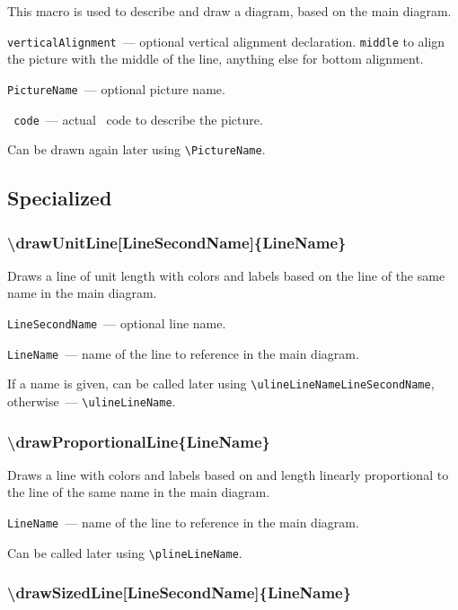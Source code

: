 	This macro is used to describe and draw a diagram, based on the main diagram.

	\texttt{verticalAlignment}~— optional vertical alignment declaration. \texttt{middle} to align the picture with the middle of the line, anything else for bottom alignment.

	\texttt{PictureName}~— optional picture name.

	\texttt{\METAPOST\ code}~— actual \METAPOST\ code to describe the picture.
	
	Can be drawn again later using \texttt{\textbackslash PictureName}.


\subsection{Specialized}

\subsubsection{\textbackslash drawUnitLine[LineSecondName]\{LineName\}}

	Draws a line of unit length with colors and labels based on the line of the same name in the main diagram.

	\texttt{LineSecondName}~— optional line name.
	
	\texttt{LineName}~— name of the line to reference in the main diagram. 

	If a name is given, can be called later using \texttt{\textbackslash ulineLineNameLineSecondName}, otherwise~— \texttt{\textbackslash ulineLineName}. 

\subsubsection{\textbackslash drawProportionalLine\{LineName\}}

	Draws a line with colors and labels based on and length linearly proportional to the line of the same name in the main diagram.

	\texttt{LineName}~— name of the line to reference in the main diagram. 
	
	Can be called later using \texttt{\textbackslash plineLineName}.


\subsubsection{\textbackslash drawSizedLine[LineSecondName]\{LineName\}}

